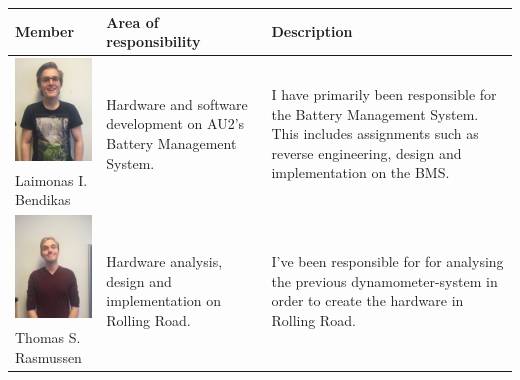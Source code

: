 \newpage
\begin{tabular}[c]{|p{3cm}| p{5cm} | p{6cm}|}
	\hline
	\textbf{Member} & \textbf{Area of responsibility} & \textbf{Description}\\\hline
	
	\phantom{Test}
	\includegraphics[width=3cm]{Introduction/TeamPictures/Laimonas} & \multirow{2}{5cm}{Hardware and software development on AU2's Battery Management System.} & \multirow{2}{6cm}{I have primarily been responsible for the Battery Management System. This includes assignments such as reverse engineering, design and implementation on the BMS.} \\
	Laimonas I. \newline Bendikas & & \\ \hline
		
	\phantom{Test}
	\includegraphics[width=3cm]{Introduction/TeamPictures/ThomasR} & \multirow{2}{5cm}{Hardware analysis, design and implementation on Rolling Road.} & \multirow{2}{6cm}{I've been responsible for for analysing the previous dynamometer-system in order to create the hardware in Rolling Road.} \\
	Thomas S. \newline Rasmussen & & \\ \hline
		

\end{tabular}
